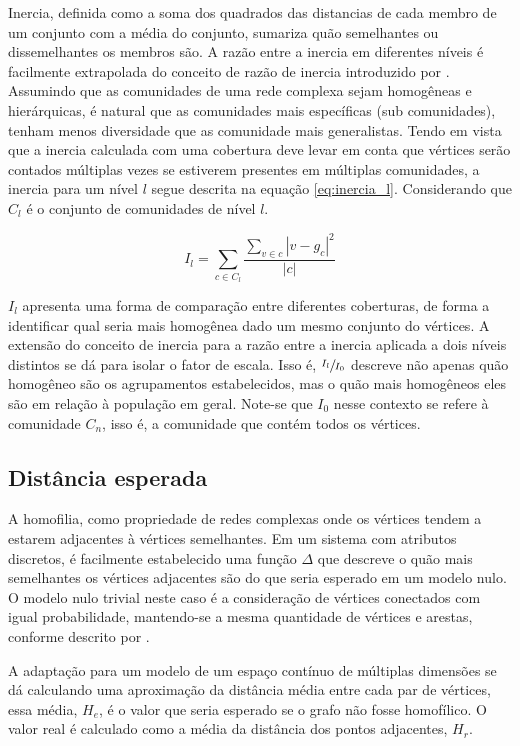 \documentclass[notes.tex]{subfiles}
\begin{document}
Inercia, definida como a soma dos quadrados das distancias de cada membro de um conjunto com a média do conjunto, sumariza quão semelhantes ou dissemelhantes os membros são.
A razão entre a inercia em diferentes níveis é facilmente extrapolada do conceito de razão de inercia introduzido por .
Assumindo que as comunidades de uma rede complexa sejam homogêneas e hierárquicas, é natural que as comunidades mais específicas (sub comunidades), tenham menos diversidade que as comunidade mais generalistas.
Tendo em vista que a inercia calculada com uma cobertura deve levar em conta que vértices serão contados múltiplas vezes se estiverem presentes em múltiplas comunidades, a inercia para um nível $l$ segue descrita na equação \ref{eq:inercia_l}.
Considerando que $C_l$ é o conjunto de comunidades de nível  $l$.

\begin{equation}\label{eq:inercia_l}
    I_l = \sum_{c \in C_l}\frac{\sum_{v \in c} |v-g_c|^2}{|c|}
\end{equation}

$I_l$ apresenta uma forma de comparação entre diferentes coberturas, de forma a identificar qual seria mais homogênea dado um mesmo conjunto do vértices.
A extensão do conceito de inercia para a razão entre a inercia aplicada a dois níveis distintos se dá para isolar o fator de escala.
Isso é, $\sfrac{I_l}{I_0}$ descreve não apenas quão homogêneo são os agrupamentos estabelecidos, mas o quão mais homogêneos eles são em relação à população em geral.
Note-se que $I_0$ nesse contexto se refere à comunidade $C_n$, isso é, a comunidade que contém todos os vértices.

\subsection{Distância esperada}

A homofilia, como propriedade de redes complexas onde os vértices tendem a estarem adjacentes à vértices semelhantes.
Em um sistema com atributos discretos, é facilmente estabelecido uma função $\Delta$  que descreve o quão mais semelhantes os vértices adjacentes são do que seria esperado em um modelo nulo.
O modelo nulo trivial neste caso é a consideração de vértices conectados com igual probabilidade, mantendo-se a mesma quantidade de vértices e arestas, conforme descrito por .

A adaptação para um modelo de um espaço contínuo de múltiplas dimensões se dá calculando uma aproximação da distância média entre cada par de vértices, essa média, $H_e$, é o valor que seria esperado se o grafo não fosse homofílico.
O valor real é calculado como a média da distância dos pontos adjacentes, $H_r$.
\end{document}
